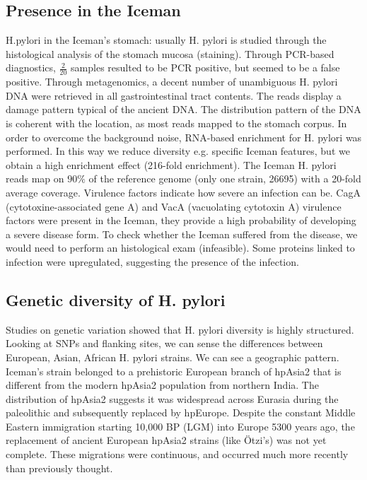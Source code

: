 	\subsection{Presence in the Iceman}
	H.pylori in the Iceman's stomach: usually H. pylori is studied through the histological analysis of the stomach mucosa (staining).
	Through PCR-based diagnostics, $\frac{2}{20}$ samples resulted to be PCR positive, but seemed to be a false positive.
	Through metagenomics, a decent number of unambiguous H. pylori DNA were retrieved in all gastrointestinal tract contents.
	The reads display a damage pattern typical of the ancient DNA.
	The distribution pattern of the DNA is coherent with the location, as most reads mapped to the stomach corpus.
	In order to overcome the background noise, RNA-based enrichment for H. pylori was performed.
	In this way we reduce diversity e.g. specific Iceman features, but we obtain a high enrichment effect (216-fold enrichment).
	The Iceman H. pylori reads map on $90\%$ of the reference genome (only one strain, 26695) with a 20-fold average coverage.
	Virulence factors indicate how severe an infection can be.
	CagA (cytotoxine-associated gene A) and VacA (vacuolating cytotoxin A) virulence factors were present in the Iceman, they provide a high probability of developing a severe disease form.
	To check whether the Iceman suffered from the disease, we would need to perform an histological exam (infeasible).
	Some proteins linked to infection were upregulated, suggesting the presence of the infection.

	\subsection{Genetic diversity of H. pylori}
	Studies on genetic variation showed that H. pylori diversity is highly structured.
	Looking at SNPs and flanking sites, we can sense the differences between European, Asian, African H. pylori strains.
	We can see a geographic pattern.
	Iceman’s strain belonged to a prehistoric European branch of hpAsia2 that is different from the modern hpAsia2 population from northern India.
	The distribution of hpAsia2 suggests it was widespread across Eurasia during the paleolithic and subsequently replaced by hpEurope.
	Despite the constant Middle Eastern immigration starting 10,000 BP (LGM) into Europe 5300 years ago, the replacement of ancient European hpAsia2 strains (like Ötzi’s) was not yet complete.
	These migrations were continuous, and occurred much more recently than previously thought.

